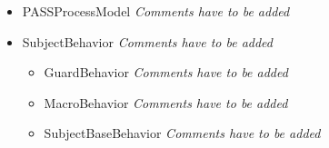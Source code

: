 \begin{itemize}
\begin{itemize}
	\item PASSProcessModel \linebreak \textit{Comments have to be added}
	\item SubjectBehavior \linebreak \textit{Comments have to be added}
	\begin{itemize}
		\item GuardBehavior \linebreak \textit{Comments have to be added}
		\item MacroBehavior \linebreak \textit{Comments have to be added}
		\item SubjectBaseBehavior \linebreak \textit{Comments have to be added}
	\end{itemize}
\end{itemize}
	

\end{itemize}
